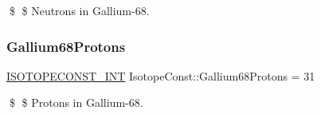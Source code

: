 \$ \$ Neutrons in Gallium-\/68. \mbox{\label{group___isotope_const-_gallium-_ga68_gabe130051a23c072399e3946fc10ad133}} 
\subsubsection{\texorpdfstring{Gallium68\+Protons}{Gallium68Protons}}
{\footnotesize\ttfamily \mbox{\hyperlink{group___isotope_const-_macros_ga5f18360b3e99483a35c32d789e62621c}{I\+S\+O\+T\+O\+P\+E\+C\+O\+N\+S\+T\+\_\+\+I\+NT}} Isotope\+Const\+::\+Gallium68\+Protons = 31}

\$ \$ Protons in Gallium-\/68. 
